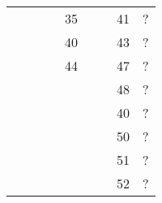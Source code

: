 \documentclass[12pt]{jarticle}
\begin{document}
\begin{table}[h]
\begin{center}
\begin{tabular}{|c|r|r|r|r|r|r|r|r|}
                                         &                               &                               &                               & 35                            &                               &                               & 41                            & ?                             \\
                                         &                               &                               &                               & 40                            &                               &                               & 43                            & ?                             \\
                                         &                               &                               &                               & 44                            &                               &                               & 47                            & ?                             \\
                                         &                               &                               &                               &                               &                               &                               & 48                            & ?                             \\
                                         &                               &                               &                               &                               &                               &                               & 40                            & ?                             \\
                                         &                               &                               &                               &                               &                               &                               & 50                            & ?                             \\
                                         &                               &                               &                               &                               &                               &                               & 51                            & ?                             \\
                                         &                               &                               &                               &                               &                               &                               & 52                            & ?                             \\ \hline

\end{tabular}
\end{center}
\end{table}
\end{document}
